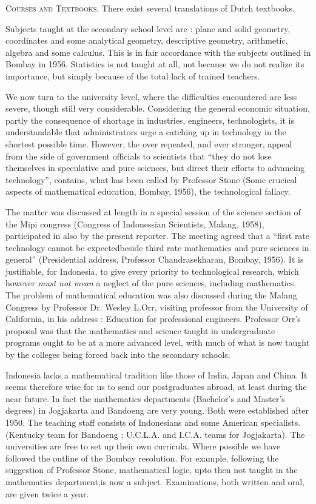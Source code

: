 \medskip
\noindent
\textsc{Courses and Textbooks.} There exist several translations of
Dutch textbooks.

Subjects taught at the secondary school level are : plane and solid
geometry, coordinates and some analytical geometry, descriptive
geometry, arithmetic, algebra and some calculus. This is in fair
accordance with the subjects outlined in Bombay in 1956. Statistics is
not taught at all, not because we do not realize its importance, but
simply because of the total lack of trained teachers. 

We now turn to the university level, where the difficulties
encountered are less severe, though still very
considerable. Considering the general economic situation, partly the
consequence of shortage in industries, engineers, technologists, it is
understandable that administrators urge a catching up in technology in
the shortest possible time. However, the over repeated, and ever
stronger, appeal from the side of government officials to scientists
that ``they do not lose themselves in speculative and pure sciences,
but direct their efforts to advancing technology'', contains, what has
been called by Professor Stone (Some crucical aspects of mathematical
education, Bombay, 1956), the technological fallacy.

The matter was discussed at length in a special session of the science
section of the Mipi congress (Congress of Indonessian Scientists,
Malang, 1958), participated in also by the present reporter. The
meeting agreed that a ``first rate technology cannot be
expected\pageoriginale beside third rate mathematics and pure sciences
in general'' (Presidential address, Professor Chandrasekharan, Bombay,
1956). It is justifiable, for Indonesia, to give every priority to
technological research, which however \textit{must not mean} a neglect
of the pure sciences, including mathematics. The problem of
mathematical education was also discussed during the Malang Congress
by Professor Dr. Wesley L.Orr, visiting professor from the University
of California, in his address : Education for professional
engineers. Professor Orr's proposal was that the mathematics and
science taught in  undergraduate programs ought to be at a more
advanced level, with much of what is now taught by the colleges being
forced back into the secondary schools.

Indonesia lacks a mathematical tradition like those of India, Japan
and China. It seems therefore wise for us to send our postgraduates
abroad, at least during the near future. In fact the mathematics
departments (Bachelor's and Master's degrees) in Jogjakarta and
Bandoeng are very young. Both were established after 1950. The
teaching staff consists of Indonesians and some American
specialists. (Kentucky team for Bandoeng ; U.C.L.A. and I.C.A. teams
for Jogjakarta). The universities are free to set up their own
curricula. Where possible we have followed the outline of the Bombay
resolution. For example, following the suggestion of Professor Stone,
mathematical logic, upto then not taught in the mathematics
department,is now a subject. Examinations, both written and oral, are
given twice a year. 

